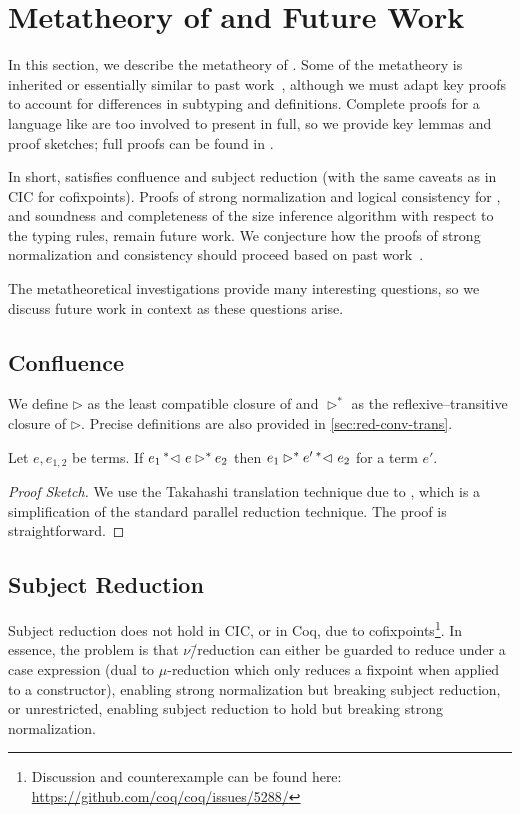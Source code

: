 \section{Metatheory of \titlelang and Future Work}
\label{sec:metatheory}

In this section, we describe the metatheory of \lang.
Some of the metatheory is inherited or essentially similar to past work~\cite{cic-hat-minus,cc-hat-omega,cic-hat}, although we must adapt key proofs to account for differences in subtyping and definitions.
Complete proofs for a language like \lang are too involved to present in full, so we provide key lemmas and proof sketches; full proofs can be found in \anotherpdf.

In short, \lang satisfies confluence and subject reduction (with the same caveats as in CIC for cofixpoints).
Proofs of strong normalization and logical consistency for \lang, and soundness and completeness of the size inference algorithm with respect to the typing rules, remain future work.
We conjecture how the proofs of strong normalization and consistency should proceed based on past work~\cite{cic-hat-minus,cc-hat-omega,cic-hat}.

The metatheoretical investigations provide many interesting questions, so we discuss future work in context as these questions arise.

\subsection{Confluence}

We define $\rhd$ as the least compatible closure of \reduction and $\rhd^*$ as the reflexive--transitive closure of $\rhd$. Precise definitions are also provided in \autoref{sec:red-conv-trans}.

\begin{theorem}[Confluence]
\label{thm:metatheory:confluence}
  Let $e, e_{1,2}$ be terms.
  If $e_1 \prescript{*}{}{\lhd ~ } e \rhd^* e_2$ then
  $e_1 \rhd^* e' \prescript{*}{}{\lhd ~ } e_2$
  for a term $e'$.
\end{theorem}
%
\begin{proof}[Proof Sketch]
  We use the Takahashi translation technique due to \citet{takahashitrans}, which is a simplification of the standard
  parallel reduction technique.
  The proof is straightforward.
\end{proof}

\subsection{Subject Reduction}
\label{sec:meta:sub-red}
Subject reduction does not hold in CIC, or in Coq, due to cofixpoints\footnote{Discussion and counterexample can be found here: \url{https://github.com/coq/coq/issues/5288/}}.
In essence, the problem is that $\nu$\=/reduction can either be guarded to reduce under a case expression (dual to $\mu$-reduction which only reduces a fixpoint when applied to a constructor), enabling strong normalization but breaking subject reduction, or unrestricted, enabling subject reduction to hold but breaking strong normalization.

